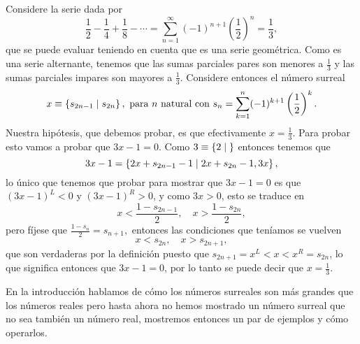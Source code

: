     \begin{example}[El inverso de 3]
        \label{inverse_3}
        Considere la serie dada por
        \[
            \frac{1}{2}-\frac{1}{4}+\frac{1}{8}-\cdots = \sum_{n=1}^{\infty} (-1)^{n+1}\left(\frac{1}{2}\right)^n = \frac{1}{3},
        \]
        que se puede evaluar teniendo en cuenta que es una serie geom\'etrica. Como es una serie alternante, tenemos que las sumas parciales pares son menores a $\frac{1}{3}$ y las sumas parciales impares son mayores a $\frac{1}{3}$. Considere entonces el n\'umero surreal
        \[
            x\equiv \left\{s_{2n-1}\;\middle|\; s_{2n}\right\},\text{ para $n$ natural con } s_n = \sum_{k=1}^{n} (-1)^{k+1}\left(\frac{1}{2}\right)^k.
        \]
        Nuestra hip\'otesis, que debemos probar, es que efectivamente $x = \frac{1}{3}$. Para probar esto vamos a probar que $3x-1 = 0$. Como $3\equiv \left\{2\;\middle|\; \right\}$ entonces tenemos que 
        \[
            3x-1 = \left\{2x+s_{2n-1}-1\;\middle|\; 2x+s_{2n}-1, 3x\right\},
        \]
        lo \'unico que tenemos que probar para mostrar que $3x-1 = 0$ es que $(3x-1)^L < 0$ y $(3x-1)^R > 0$, y como $3x > 0$, esto se traduce en 
        \[
            x < \frac{1-s_{2n-1}}{2},\quad x > \frac{1-s_{2n}}{2}, 
        \]
        pero f\'ijese que $\frac{1-s_{n}}{2} = s_{n+1},$ entonces las condiciones que ten\'iamos se vuelven
        \[
            x < s_{2n},\quad x > s_{2n+1},
        \]
        que son verdaderas por la definici\'on puesto que $s_{2n+1} = x^L < x < x^R = s_{2n}$, lo que significa entonces que $3x-1 = 0$, por lo tanto se puede decir que $x = \frac{1}{3}$.
    \end{example}

    En la introducci\'on hablamos de c\'omo los n\'umeros surreales son m\'as grandes que los n\'umeros reales pero hasta ahora no hemos mostrado un n\'umero surreal que no sea tambi\'en un n\'umero real, mostremos entonces un par de ejemplos y c\'omo operarlos.

